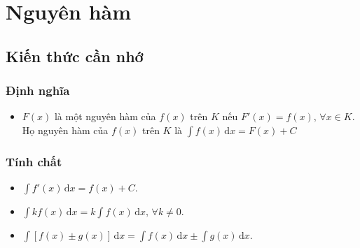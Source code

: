 \setcounter{ex}{0}
\section{Nguyên hàm}
\subsection{Kiến thức cần nhớ}
\begin{khung}
	\subsubsection{Định nghĩa}
	\begin{itemize}
		\item $F(x)$ là một nguyên hàm của $f(x)$ trên $K$ nếu $F'(x)=f(x),\, \forall x \in K$.\\
		Họ nguyên hàm của $f(x)$ trên $K$ là
		$\displaystyle\int f(x)\mathrm{\,d}x =F(x)+C$
			\end{itemize}
			\subsubsection{Tính chất}
			\begin{itemize}
		\item $\displaystyle\int f'(x) \mathrm{\,d}x = f(x)+C$.
		\item $\displaystyle\int k f(x) \mathrm{\,d}x = k \displaystyle\int f(x) \mathrm{\,d}x,\, \forall k \ne 0$. 
		\item $\displaystyle\int \left[f(x) \pm g(x)\right] \mathrm{\,d}x =  \displaystyle\int f(x) \mathrm{\,d}x \pm \displaystyle\int g(x) \mathrm{\,d}x $.   
			\end{itemize}

\end{khung}
